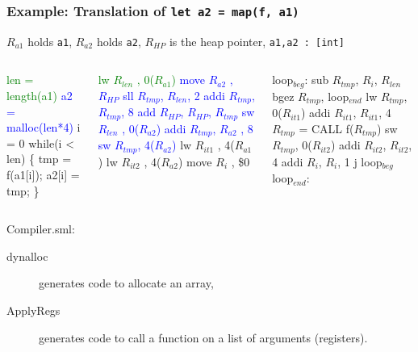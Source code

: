 \documentclass{beamer}
\newcommand{\blue}[1]{\textcolor{Blue}{{#1}}}
\newcommand{\green}[1]{\textcolor{Green}{{#1}}}
\newcommand{\emp}[1]{\textcolor{DikuRed}{ #1}}
\newcommand{\mymath}[1]{$ #1 $}
\newcommand{\myindx}[1]{_{#1}}
\begin{document}
\begin{frame}[fragile,t]
    \frametitle{Example: Translation of {\tt let a2 = map(f, a1)}}

\begin{block}{$R_{a1}$ holds {\tt a1}, $R_{a2}$ holds {\tt a2}, 
$R_{HP}$ is the heap pointer, {\tt a1,a2~:~[int]}}
\begin{columns}
\begin{colorcode}[fontsize=\scriptsize]
\green{len = length(a1)}
\blue{a2  = malloc(len*4)}
\emp{i = 0}
\emp{while(i < len) \{}
    tmp   = f(a1[i]);
    a2[i] = tmp;
\emp{\}}
\end{colorcode}
 
\begin{colorcode}[fontsize=\scriptsize]
\green{lw   \mymath{R\myindx{len}} , 0(\mymath{R\myindx{a1}})}
\blue{move \mymath{R\myindx{a2}} , \mymath{R\myindx{HP}}}
\blue{sll  \mymath{R\myindx{tmp}}, \mymath{R\myindx{len}}, 2}
\blue{addi \mymath{R\myindx{tmp}}, \mymath{R\myindx{tmp}}, 8}
\blue{add  \mymath{R\myindx{HP}}, \mymath{R\myindx{HP}}, \mymath{R\myindx{tmp}}}
\blue{sw   \mymath{R\myindx{len}} , 0(\mymath{R\myindx{a2}})}
\blue{addi \mymath{R\myindx{tmp}}, \mymath{R\myindx{a2}} , 8}
\blue{sw   \mymath{R\myindx{tmp}}, 4(\mymath{R\myindx{a2}})}
\emp{lw   \mymath{R\myindx{it1}} , 4(\mymath{R\myindx{a1}})}
\emp{lw   \mymath{R\myindx{it2}} , 4(\mymath{R\myindx{a2}})}
\emp{move \mymath{R\myindx{i}}  , \$0}
\end{colorcode}

\begin{colorcode}[fontsize=\scriptsize]
\emp{loop\mymath{\myindx{beg}}:}
\emp{        sub    \mymath{R\myindx{tmp}}, \mymath{R\myindx{i}}, \mymath{R\myindx{len}}}
\emp{        bgez   \mymath{R\myindx{tmp}}, loop\mymath{\myindx{end}}}
        lw     \mymath{R\myindx{tmp}}, 0(\mymath{R\myindx{it1}})
        addi   \mymath{R\myindx{it1}}, \mymath{R\myindx{it1}}, 4
\alert{        \mymath{R\myindx{tmp}} = CALL f(\mymath{R\myindx{tmp}})}
        sw     \mymath{R\myindx{tmp}}, 0(\mymath{R\myindx{it2}})
        addi   \mymath{R\myindx{it2}}, \mymath{R\myindx{it2}}, 4
        addi   \mymath{R\myindx{i}}, \mymath{R\myindx{i}}, 1
\emp{        j      loop\mymath{\myindx{beg}}}
\emp{loop\mymath{\myindx{end}}:}
\end{colorcode}
\end{columns}
\end{block}

\bigskip
Compiler.sml:\smallskip
\begin{description}

    \item[dynalloc] generates code to allocate an array,\smallskip

    \item[ApplyRegs] generates code to call a function on a list of arguments (registers).\smallskip

\end{description}

\end{frame}

\end{document}
